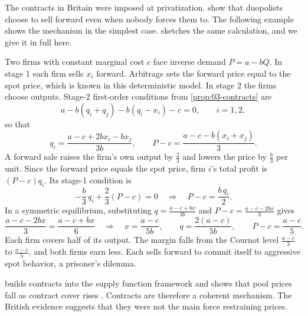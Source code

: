 The contracts in Britain were imposed at privatization. \citet{AllazVila1993} show that duopolists choose to sell
forward even when nobody forces them to. The following example shows the mechanism in the simplest case.
 sketches the same calculation, and we give it in full here.

\begin{example}\label{ex:03-allaz-vila}
Two firms with constant marginal cost $c$ face inverse demand $P = a - bQ$. In stage 1 each firm sells $x_i$ forward.
Arbitrage sets the forward price equal to the spot price, which is known in this deterministic model. In stage 2 the
firms choose outputs. Stage-2 first-order conditions from \cref{prop:03-contracts} are
\begin{equation*}
a - b(q_i + q_j) - b(q_i - x_i) - c = 0, \qquad i = 1, 2,
\end{equation*}
so that
\begin{equation*}
q_i = \frac{a - c + 2b x_i - b x_j}{3b},
\qquad
P - c = \frac{a - c - b(x_i + x_j)}{3}.
\end{equation*}
A forward sale raises the firm's own output by $\frac{2}{3}$ and lowers the price by $\frac{b}{3}$ per unit. Since the
forward price equals the spot price, firm $i$'s total profit is $(P - c)q_i$. Its stage-1 condition is
\begin{equation*}
-\frac{b}{3}\, q_i + \frac{2}{3}(P - c) = 0
\quad\Longrightarrow\quad
P - c = \frac{b\, q_i}{2}.
\end{equation*}
In a symmetric equilibrium, substituting $q = \frac{a - c + bx}{3b}$ and $P - c = \frac{a - c - 2bx}{3}$ gives
\begin{equation*}
\frac{a - c - 2bx}{3} = \frac{a - c + bx}{6}
\quad\Longrightarrow\quad
x = \frac{a - c}{5b}, \qquad q = \frac{2(a - c)}{5b}, \qquad P - c = \frac{a - c}{5}.
\end{equation*}
Each firm covers half of its output. The margin falls from the Cournot level $\frac{a - c}{3}$ to $\frac{a - c}{5}$,
and both firms earn less. Each sells forward to commit itself to aggressive spot behavior, a prisoner's dilemma.
\end{example}

\citet{Green1999} builds contracts into the supply function framework and shows that pool prices fall as contract
cover rises \citep[p.~810]{Wolfram1999}. Contracts are therefore a coherent mechanism. The British evidence suggests that
they were not the main force restraining prices.

